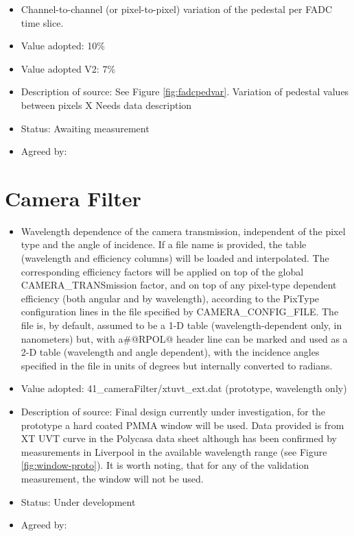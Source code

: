 \documentclass[GCT,short]{gct}
\begin{document}
\begin{itemize}
\item Channel-to-channel (or pixel-to-pixel) variation of the pedestal per FADC time slice.
\item Value adopted: 10\%
\item Value adopted V2: 7\%
\item Description of source: See Figure \ref{fig:fadcpedvar}. Variation of pedestal values between pixels \color{red} X Needs data description \color{black}
\item Status: \color{red}Awaiting measurement\color{black}
\item Agreed by: 
\end{itemize}

\section{Camera Filter}
\begin{itemize}
\item Wavelength dependence of the camera transmission, independent of the pixel type and the angle of incidence. If a file name is provided, the table (wavelength and efficiency columns) will be loaded and interpolated. The corresponding efficiency factors will be applied on top of the global CAMERA\_TRANSmission factor, and on top of any pixel-type dependent efficiency (both angular and by wavelength), according to the PixType configuration lines in the file specified by CAMERA\_CONFIG\_FILE. The file is, by default, assumed to be a 1-D table (wavelength-dependent only, in nanometers) but, with a\#@RPOL@ header line can be marked and used as a 2-D table (wavelength and angle dependent), with the incidence angles specified in the file in units of degrees but internally converted to radians.
\item Value adopted: 41\_cameraFilter/xtuvt\_ext.dat (prototype, wavelength only)
\item Description of source: Final design currently under investigation, for the prototype a hard coated PMMA window will be used. Data provided is from XT UVT curve in the Polycasa data sheet although has been confirmed by measurements in Liverpool in the available wavelength range (see Figure \ref{fig:window-proto}). It is worth noting, that for any of the validation measurement, the window will not be used. 
\item Status: Under development
\item Agreed by:
\end{itemize}
\end{document}
